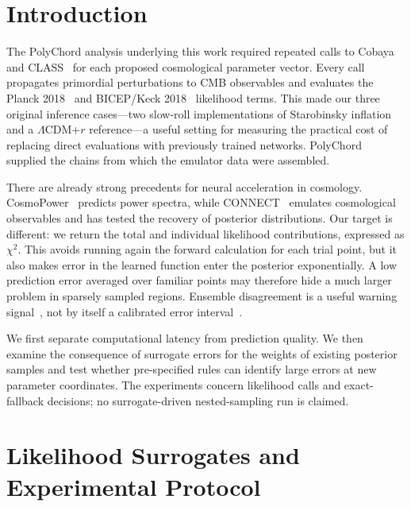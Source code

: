 \documentclass[a4paper,conference,10pt]{IEEEtran}
\begin{document}
\section{Introduction}
The PolyChord analysis underlying this work required repeated calls to Cobaya~\cite{torrado2021} and CLASS~\cite{blas2011} for each proposed cosmological parameter vector. Every call propagates primordial perturbations to CMB observables and evaluates the Planck 2018~\cite{planck2020} and BICEP/Keck 2018~\cite{bk2021} likelihood terms. This made our three original inference cases---two slow-roll implementations of Starobinsky inflation~\cite{starobinsky1980} and a $\Lambda$CDM+$r$ reference---a useful setting for measuring the practical cost of replacing direct evaluations with previously trained networks. PolyChord~\cite{handley2015} supplied the chains from which the emulator data were assembled.

There are already strong precedents for neural acceleration in cosmology. CosmoPower~\cite{mancini2022} predicts power spectra, while CONNECT~\cite{nygaard2023} emulates cosmological observables and has tested the recovery of posterior distributions. Our target is different: we return the total and individual likelihood contributions, expressed as $\chi^2$. This avoids running again the forward calculation for each trial point, but it also makes error in the learned function enter the posterior exponentially. A low prediction error averaged over familiar points may therefore hide a much larger problem in sparsely sampled regions. Ensemble disagreement is a useful warning signal~\cite{lakshminarayanan2017}, not by itself a calibrated error interval~\cite{guo2017}.

We first separate computational latency from prediction quality. We then examine the consequence of surrogate errors for the weights of existing posterior samples and test whether pre-specified rules can identify large errors at new parameter coordinates. The experiments concern likelihood calls and exact-fallback decisions; no surrogate-driven nested-sampling run is claimed.

\section{Likelihood Surrogates and Experimental Protocol}
\end{document}
